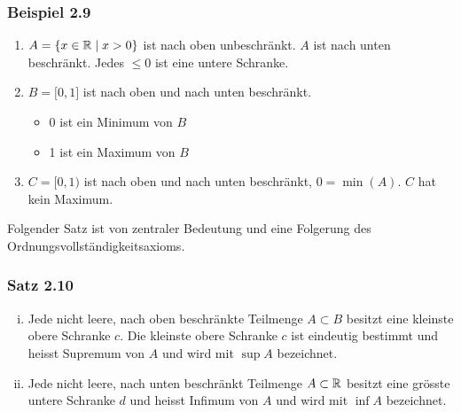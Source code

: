 \subsubsection*{Beispiel 2.9}
\begin{enumerate}
\item $A=\{x\in\mathbb{R}\mid x>0\}$ ist nach oben unbeschränkt. $A$ ist nach unten beschränkt. Jedes $\leq 0$ ist eine untere Schranke.
\item $B=\lbrack 0,1\rbrack$ ist nach oben und nach unten beschränkt. \begin{itemize}
\item 0 ist ein Minimum von $B$
\item 1 ist ein Maximum von $B$
\end{itemize}
\item $C=\lbrack 0,1)$ ist nach oben und nach unten beschränkt, $0=\min(A)$. $C$ hat kein Maximum.
\end{enumerate}
Folgender Satz ist von zentraler Bedeutung und eine Folgerung des Ordnungsvollständigkeitsaxioms.

\subsubsection*{Satz 2.10}
\begin{enumerate}[i)]
\item Jede nicht leere, nach oben beschränkte Teilmenge $A\subset B$ besitzt eine kleinste obere Schranke $c$. Die kleinste obere Schranke $c$ ist eindeutig bestimmt und heisst Supremum von $A$ und wird mit $\sup A$ bezeichnet.
\item Jede nicht leere, nach unten beschränkt Teilmenge $A\subset\mathbb{R}$ besitzt eine grösste untere Schranke $d$ und heisst Infimum von $A$ und wird mit $\inf A$ bezeichnet.
\end{enumerate}
